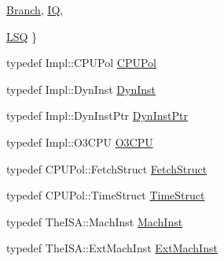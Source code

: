 \begin{DoxyCompactItemize}
\hyperlink{classDefaultFetch_a818d5f50fdcec74a1a445b4fa8b760e3a070f4c50ffea5accaf5f88606fc088a8}{Branch}, 
\hyperlink{classDefaultFetch_a818d5f50fdcec74a1a445b4fa8b760e3a7608065caa4249ff47a58c32d6f3c531}{IQ}, 
\par
\hyperlink{classDefaultFetch_a818d5f50fdcec74a1a445b4fa8b760e3a4cc572b5087c4e67104941ee638a8512}{LSQ}
 \}
\item 
typedef Impl::CPUPol \hyperlink{classDefaultFetch_a87d662eaeb9eab249d671b63cb4ba11a}{CPUPol}
\item 
typedef Impl::DynInst \hyperlink{classDefaultFetch_ab741745c86a14c765b999c11167636d9}{DynInst}
\item 
typedef Impl::DynInstPtr \hyperlink{classDefaultFetch_a028ce10889c5f6450239d9e9a7347976}{DynInstPtr}
\item 
typedef Impl::O3CPU \hyperlink{classDefaultFetch_a44622cf06940413482836cb62931ac3f}{O3CPU}
\item 
typedef CPUPol::FetchStruct \hyperlink{classDefaultFetch_a3aac8607069f16898ef53cfaa2d97aeb}{FetchStruct}
\item 
typedef CPUPol::TimeStruct \hyperlink{classDefaultFetch_ab7dd3632ef639702a5c6e7c2c3a2f82a}{TimeStruct}
\item 
typedef TheISA::MachInst \hyperlink{classDefaultFetch_a4617f528417b8f55f809ae0988284c9b}{MachInst}
\item 
typedef TheISA::ExtMachInst \hyperlink{classDefaultFetch_a5605d4fc727eae9e595325c90c0ec108}{ExtMachInst}
\end{DoxyCompactItemize}
